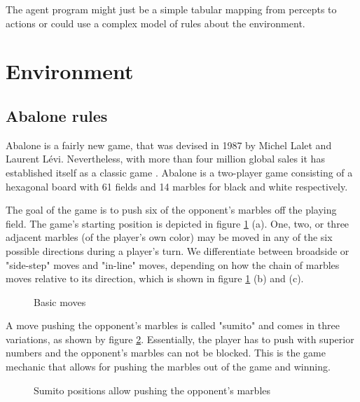 The agent program might just be a simple tabular mapping from percepts to actions or could use a complex model of rules about the environment.

\section{Environment}

\subsection{Abalone rules}
Abalone is a fairly new game, that was devised in 1987 by Michel Lalet and Laurent Lévi. Nevertheless, with more than four million global sales it has established itself as a classic game \cite{noauthor_abalone_2020}. Abalone is a two-player game consisting of a hexagonal board with 61 fields and 14 marbles for black and white respectively.

The goal of the game is to push six of the opponent's marbles off the playing field. The game's starting position is depicted in figure \ref{basics} (a). One, two, or three adjacent marbles (of the player's own color) may be moved in any of the six possible directions during a player's turn. We differentiate between broadside or "side-step" moves and "in-line" moves, depending on how the chain of marbles moves relative to its direction, which is shown in figure \ref{basics} (b) and (c).

\begin{figure}[!h]
    \centering
    \hfill
    \hfill
    \caption{Basic moves \cite{abalone_sa_abalone_nodate}}
    \label{basics}
\end{figure}

A move pushing the opponent's marbles is called "sumito" and comes in three variations, as shown by figure \ref{sumito}. Essentially, the player has to push with superior numbers and the opponent's marbles can not be blocked. This is the game mechanic that allows for pushing the marbles out of the game and winning.

\begin{figure}[!h]
    \centering
    \hfill
    \hfill
    \caption{Sumito positions allow pushing the opponent's marbles \cite{abalone_sa_abalone_nodate}}
    \label{sumito}
\end{figure}

